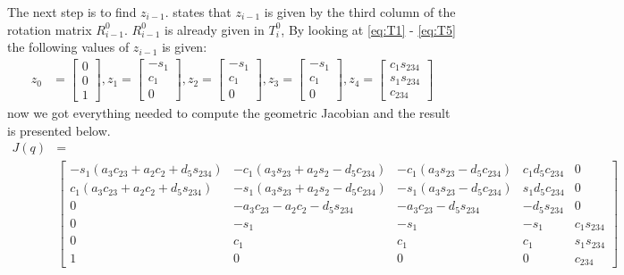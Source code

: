 The next step is to find $z_{i-1}$. \cite{Siciliano} states that $z_{i-1}$ is given by the third column of the rotation matrix $R_{i-1}^0$. $R_{i-1}^0$ is already given in $T_i^0$, By looking at \eqref{eq:T1} - \eqref{eq:T5} the following values of $z_{i-1}$ is given:
\begin{align*}
    z_0 &= \begin{bmatrix}0\\0\\1\end{bmatrix},
    z_1 = \begin{bmatrix}-s_1\\c_1\\0\end{bmatrix},
    z_2 = \begin{bmatrix}-s_1\\c_1\\0\end{bmatrix},
    z_3 = \begin{bmatrix}-s_1\\c_1\\0\end{bmatrix},
    z_4 = \begin{bmatrix}c_1s_{234}\\s_1s_{234}\\c_{234}\end{bmatrix}
\end{align*}
now we got everything needed to compute the geometric Jacobian and the result is presented below.
\begin{align*}
    J(q) &= \\
    &\begin{bmatrix}
        -s_1(a_3c_{23} + a_2c_{2} + d_5s_{234}) & 
        -c_1(a_3s_{23} + a_2s_{2} - d_5c_{234}) & 
        -c_1(a_3s_{23} - d_5c_{234})            & 
        c_1d_5c_{234}                           & 
        0\\
        c_1(a_3c_{23} + a_2c_{2} + d_5s_{234})  & 
        -s_1(a_3s_{23} + a_2s_{2} - d_5c_{234}) & 
        -s_1(a_3s_{23} - d_5c_{234})            & 
        s_1d_5c_{234}                           & 
        0\\
        0                                       &
        -a_3c_{23}- a_2c_2 - d_5s_{234}         &
        -a_3c_{23} - d_5s_{234}                 &
        -d_5s_{234}                             &
        0\\
        0                                       &
        -s_1                                    &
        -s_1                                    &
        -s_1                                    &
        c_1s_{234}\\
        0                                       &
        c_1&
        c_1&
        c_1&
        s_1s_{234}\\
        1& 0 & 0 & 0 & c_{234}
    \end{bmatrix}
\end{align*}
